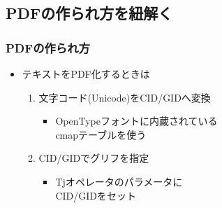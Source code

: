 \subsection{PDFの作られ方を紐解く}
\begin{frame}\frametitle{PDFの作られ方}
  \begin{itemize}
  \item テキストをPDF化するときは
    \begin{enumerate}
    \item 文字コード(Unicode)をCID/GIDへ変換
      \begin{itemize}
      \item OpenTypeフォントに内蔵されている \\ cmapテーブルを使う
      \end{itemize}
    \item CID/GIDでグリフを指定
      \begin{itemize}
      \item Tjオペレータのパラメータに \\ CID/GIDをセット
      \end{itemize}
    \end{enumerate}

    \begin{center}
      \footnotesize
      
    \end{center}
  \end{itemize}
\end{frame}


